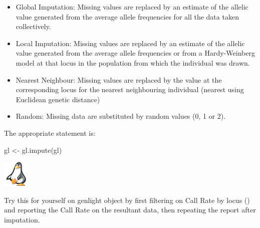\documentclass[
  letterpaper,
  DIV=11,
  numbers=noendperiod]{scrreprt}
\newenvironment{Shaded}{\begin{snugshade}}{\end{snugshade}}
\newcommand{\FunctionTok}[1]{\textcolor[rgb]{0.02,0.16,0.49}{#1}}
\newcommand{\NormalTok}[1]{\textcolor[rgb]{0.00,0.44,0.13}{#1}}
\newcommand{\OtherTok}[1]{\textcolor[rgb]{0.00,0.44,0.13}{#1}}
\providecommand{\tightlist}{%
  \setlength{\itemsep}{0pt}\setlength{\parskip}{0pt}}\usepackage{longtable,booktabs,array}
\let\textttOrig\texttt
\renewcommand{\texttt}[1]{\textttOrig{\color{blue}{#1}}}
\begin{document}
\begin{itemize}
\tightlist
\item
  Global Imputation: Missing values are replaced by an estimate of the
  allelic value generated from the average allele frequencies for all
  the data taken collectively.
\item
  Local Imputation: Missing values are replaced by an estimate of the
  allelic value generated from the average allele frequencies or from a
  Hardy-Weinberg model at that locus in the population from which the
  individual was drawn.
\item
  Nearest Neighbour: Missing values are replaced by the value at the
  corresponding locus for the nearest neighbouring individual (nearest
  using Euclidean genetic distance)
\item
  Random: Missing data are substituted by random values (0, 1 or 2).
\end{itemize}

The appropriate statement is:

\begin{Shaded}
\begin{Highlighting}[]
\NormalTok{gl }\OtherTok{\textless{}{-}} \FunctionTok{gl.impute}\NormalTok{(gl)}
\end{Highlighting}
\end{Shaded}

\begin{tcolorbox}[enhanced jigsaw, coltitle=black, colframe=quarto-callout-note-color-frame, colbacktitle=quarto-callout-note-color!10!white, breakable, bottomtitle=1mm, rightrule=.15mm, opacitybacktitle=0.6, left=2mm, arc=.35mm, opacityback=0, leftrule=.75mm, toptitle=1mm, titlerule=0mm, title=\textcolor{quarto-callout-note-color}{\faInfo}\hspace{0.5em}{Exercise}, bottomrule=.15mm, toprule=.15mm, colback=white]

\includegraphics[width=0.5in,height=0.5in]{images/task.png}

Try this for yourself on genlight object \texttt{testset.gl} by first
filtering on Call Rate by locus (\texttt{threshold\ =\ 0.90}) and
reporting the Call Rate on the resultant data, then repeating the report
after imputation.

\end{tcolorbox}
\end{document}
